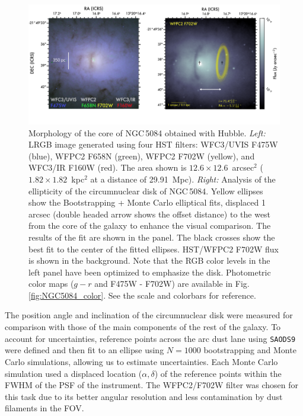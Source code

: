 \documentclass[modern]{CORE-AAS/aastex631}
\begin{document}
{\begin{figure}[t!]
\begin{center}
\includegraphics[trim={0 160 0 0}, clip, width=\textwidth]{FIGURES/HST_Torus_model.png}
\caption{Morphology of the core of NGC\,5084 obtained with Hubble. \emph{Left:} LRGB image generated using four HST filters: WFC3/UVIS F475W (blue), WFPC2 F658N (green), WFPC2 F702W (yellow), and WFC3/IR F160W (red). The area shown is $12.6\times12.6$~arcsec$^2$ ($1.82\times1.82$~kpc$^2$ at a distance of 29.91~Mpc). \emph{Right:} Analysis of the ellipticity of the circumnuclear disk of NGC\,5084. Yellow ellipses show the Bootstrapping + Monte Carlo elliptical fits, displaced 1 arcsec (double headed arrow shows the offset distance) to the west from the core of the galaxy to enhance the visual comparison. The results of the fit are shown in the panel. The black crosses show the best fit to the center of the fitted ellipses. HST/WFPC2 F702W flux is shown in the background. Note that the RGB color levels in the left panel have been optimized to emphasize the disk. Photometric color maps ($g-r$ and F475W - F702W) are available in Fig.\,\ref{fig:NGC5084_color}. See the scale and colorbars for reference.} 
\label{fig:NGC5084_hst}
\end{center}
\end{figure}


The position angle and inclination of the circumnuclear disk were measured for comparison with those of the main components of the rest of the galaxy. To account for uncertainties, reference points across the arc dust lane using \texttt{SAODS9} were defined and then fit to an ellipse using $N=1000$ bootstrapping and Monte Carlo simulations, allowing us to estimate uncertainties. Each Monte Carlo simulation used a displaced location ($\alpha, \delta$) of the reference points within the FWHM of the PSF of the instrument. The WFPC2/F702W filter was chosen for this task due to its better angular resolution and less contamination by dust filaments in the FOV. \par 

}
\end{document}
